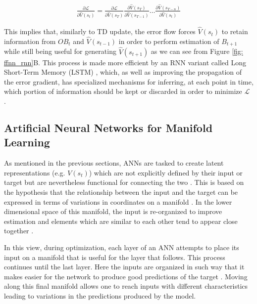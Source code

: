 \begin{gather}
\label{bptt_2}
    \frac{\partial \mathcal{L}}{\partial \widehat{V}(s_t)} = 
    \frac{\partial \mathcal{L}}{\partial \widehat{V}(s_{T})}
    \frac{\partial \widehat{V}(s_{T})}{\partial \widehat{V}(s_{T-1})}
    \dots
    \frac{\partial \widehat{V}(s_{T-n})}{\partial \widehat{V}(s_{t})}
\end{gather}

This implies that, similarly to TD update, the error flow forces $\widehat{V}(s_t)$ to retain information from $OB_t$ and $\widehat{V}(s_{t-1})$ in order to perform estimation of $B_{t+1}$ while still being useful for generating $\widehat{V}(s_{t+1})$ as we can see from Figure \ref{fig: ffnn_rnn}B. This process is made more efficient by an RNN variant called Long Short-Term Memory (LSTM) \cite{hochreiter1997long}, which, as well as improving the propagation of the error gradient, has specialized mechanisms for inferring, at each point in time, which portion of information should be kept or discarded in order to minimize $\mathcal{L}$ \cite{hochreiter1997long,bengio2017deep}.



\subsection{Artificial Neural Networks for Manifold Learning}
\label{manifold_learning}
As mentioned in the previous sections, ANNs are tasked to create latent representations (e.g. $V(s_{t})$) which are not explicitly defined by their input or target but are nevertheless functional for connecting the two \cite{rumelhart1986learning,bengio2017deep,lillicrap2020backpropagation}. This is based on the hypothesis that the relationship between the input and the target can be expressed in terms of variations in coordinates on a manifold \cite{bengio2017deep}. In the lower dimensional space of this manifold, the input is re-organized to improve estimation and elements which are similar to each other tend to appear close together \cite{bengio2017deep}. 

In this view, during optimization, each layer of an ANN attempts to place its input on a manifold that is useful for the layer that follows. This process continues until the last layer. Here the inputs are organized in such way that it makes easier for the network to produce good predictions of the target \cite{bengio2017deep}. Moving along this final manifold allows one to reach inputs with different characteristics leading to variations in the predictions produced by the model. 

